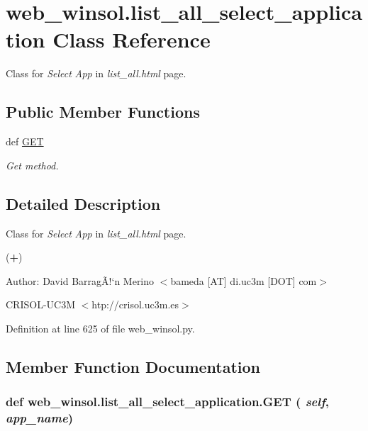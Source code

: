 \hypertarget{classweb__winsol_1_1list__all__select__application}{
\section{web\_\-winsol.list\_\-all\_\-select\_\-application Class Reference}
\label{classweb__winsol_1_1list__all__select__application}
}
Class for {\em Select\/} {\em App\/} in {\em list\_\-all.html\/} page.  


\subsection*{Public Member Functions}
\begin{CompactItemize}
\item 
def \hyperlink{classweb__winsol_1_1list__all__select__application_efadcb2532ff42e92466d40f288a8300}{GET}
\begin{CompactList}\small\item\em Get method. \item\end{CompactList}\end{CompactItemize}


\subsection{Detailed Description}
Class for {\em Select\/} {\em App\/} in {\em list\_\-all.html\/} page. 

({\bf +})

\begin{Desc}
\item[Author:]David Barrag\~{A}!`n Merino $<$bameda \mbox{[}AT\mbox{]} di.uc3m \mbox{[}DOT\mbox{]} com$>$ 

CRISOL-UC3M $<$htp://crisol.uc3m.es$>$ \end{Desc}




Definition at line 625 of file web\_\-winsol.py.

\subsection{Member Function Documentation}
\hypertarget{classweb__winsol_1_1list__all__select__application_efadcb2532ff42e92466d40f288a8300}{
\subsubsection[GET]{\setlength{\rightskip}{0pt plus 5cm}def web\_\-winsol.list\_\-all\_\-select\_\-application.GET ( {\em self},  {\em app\_\-name})}}
\label{classweb__winsol_1_1list__all__select__application_efadcb2532ff42e92466d40f288a8300}


